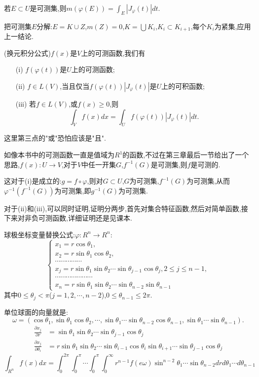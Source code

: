 \documentclass[12pt,a4paper,openany]{book}
\begin{document}
\begin{enumerate}
若$E \subset U$是可测集,则$m(\varphi(E))=\int_{E}{|J_{\varphi}(t)|dt}$.

把可测集$E$分解:$E=K \cup Z$,$m(Z)=0$,$K=\bigcup{K_i}$,$K_i \subset K_{i+1}$,每个$K_i$为紧集,应用上一结论.

(换元积分公式)$f(x)$是$V$上的可测函数,我们有
\begin{enumerate}
\item[(i)] $f(\varphi(t))$是$U$上的可测函数;
\item[(ii)] $f \in L(V)$,当且仅当$f(\varphi(t))|J_{\varphi}(t)|$是$U$上的可积函数;
\item[(iii)] 若$f \in L(V)$,或$f(x) \ge 0$,则
\[
\int_{V}{f(x)dx} = \int_{U}{f(\varphi(t))|J_{\varphi}(t)|dt}.
\]
\end{enumerate}

这里第三点的"或"恐怕应该是"且".

如像本书中的可测函数一直是值域为$R^1$的函数,不过在第三章最后一节给出了一个思路,$f(x):U \rightarrow V$,对于$V$中任一开集$G$,$f^{-1}(G)$是可测集,则$f$是可测的.

这对于(i)是成立的:$g=f \circ \varphi$,则对$G \subset U$,$G$为可测集,$f^{-1}(G)$为可测集,从而$\varphi^{-1}(f^{-1}(G))$为可测集,即$g^{-1}(G)$为可测集.

对于(ii)和(iii),可以同时证明,证明分两步,首先对集合特征函数,然后对简单函数,接下来对非负可测函数,详细证明还是见课本.

球极坐标变量替换公式:$\varphi:R^n \rightarrow R^n$:
\[
\begin{cases}
x_1 = r\cos{\theta_1}, \\
x_2 = r\sin{\theta_1}\cos{\theta_2}, \\
\cdots\cdots\cdots\cdots\cdots\\
x_j=r\sin{\theta_1}\sin{\theta_2}\cdots\sin{\theta_{j-1}}\cos{\theta_j},2 \le j \le n-1,\\
\cdots\cdots\cdots\cdots\cdots\cdots\cdots\\
x_n=r\sin{\theta_1}\sin{\theta_2}\cdots\sin{\theta_{n-2}}\sin{\theta_{n-1}}
\end{cases}
\]
其中$0 \le \theta_j < \pi$($j=1,2,\cdots,n-2$),$0 \le \theta_{n-1} \le 2\pi$.

单位球面的向量就是:
\[
\omega=(\cos{\theta_1},\sin{\theta_1}\cos{\theta_2}, \cdots, \sin{\theta_1}\cdots\sin{\theta_{n-2}}\cos{\theta_{n-1}},\sin{\theta_1}\cdots\sin{\theta_{n-1}}).
\]
\[
\begin{aligned}
\frac{\partial{x_j}}{\partial{r}} &= \sin{\theta_1}\sin{\theta_2}\cdots\sin{\theta_{j-1}}\cos{\theta_j} \\
\frac{\partial{x_j}}{\partial{\theta_i}} &= r\sin{\theta_1}\sin{\theta_2}\cdots\sin{\theta_{i-1}}\cos{\theta_i}\sin{\theta_{i+1}}\cdots\sin{\theta_{j-1}}\cos{\theta_j}
\end{aligned}
\]
\[
\int_{R^n}{f(x)dx}=\int_{0}^{2\pi}\int_{0}^{\pi}\cdots\int_{0}^{\pi}\int_{0}^{\infty}{r^{n-1}f(e\omega)\sin^{n-2}{\theta_1}\cdots\sin{\theta_{n-2}}drd{\theta_1}\cdots d{\theta_{n-1}}}
\]


\end{enumerate}
\end{document}
